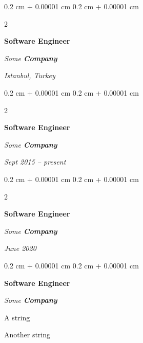 \documentclass[10pt, letterpaper]{article}
\newenvironment{summary}{
    \begin{description}[
        topsep=0.10 cm,
        parsep=0.10 cm,
        partopsep=0pt,
        itemsep=0pt,
        leftmargin=0.4 cm + 10pt
    ]
}{
    \end{description}
} %
\newenvironment{onecolentry}{
    \begin{adjustwidth}{
        0.2 cm + 0.00001 cm
    }{
        0.2 cm + 0.00001 cm
    }
}{
    \end{adjustwidth}
} %
\newenvironment{twocolentry}[2][]{
    \onecolentry
    \def\secondColumn{#2}
    \setcolumnwidth{\fill, 4.5 cm}
    \begin{paracol}{2}
}{
    \switchcolumn \raggedleft \secondColumn
    \end{paracol}
    \endonecolentry
} %
\begin{document}
        \begin{twocolentry}{
        \textit{Istanbul, Turkey}    
            
        }
            \textbf{Software Engineer}
            
            \textit{Some \textbf{Company}}
        \end{twocolentry}


        \vspace{0.2 cm}

        \begin{twocolentry}{
            
            
        \textit{Sept 2015 – present}}
            \textbf{Software Engineer}
            
            \textit{Some \textbf{Company}}
        \end{twocolentry}


        \vspace{0.2 cm}

        \begin{twocolentry}{
            
            
        \textit{June 2020}}
            \textbf{Software Engineer}
            
            \textit{Some \textbf{Company}}
        \end{twocolentry}


        \vspace{0.2 cm}

        \begin{onecolentry}
            \textbf{Software Engineer}
            
            \textit{Some \textbf{Company}}
        \end{onecolentry}
            \begin{summary}
                \item A string
                \item Another string
            \end{summary}


        \vspace{0.2 cm}
\end{document}
